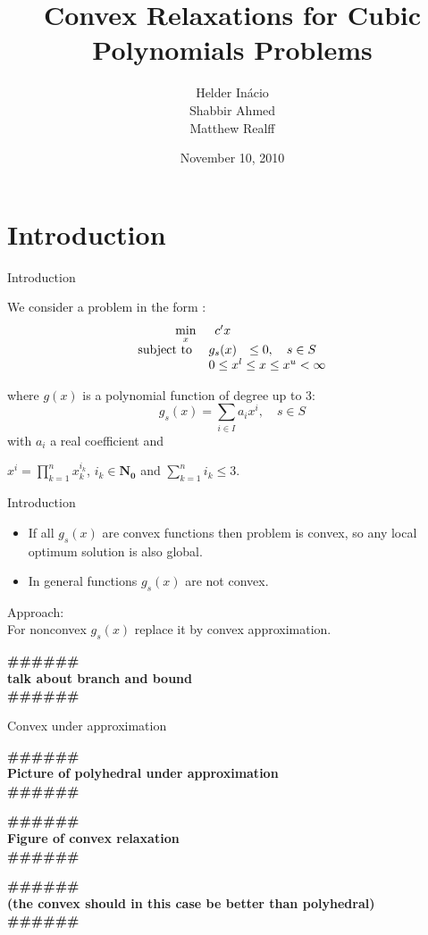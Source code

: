 \documentclass{beamer}
\title{Convex Relaxations for Cubic Polynomials Problems}
\author[In\'acio, Ahmed, Realff]{Helder In\'acio \\ Shabbir Ahmed \\ Matthew Realff}
\date{November 10, 2010}
\institute[GATech]{Georgia Institute of Technology}
\newcommand{\todo}[1]
{\begin{tiny}
  \begin{center} {\color{red}
  \textbf{ {\#\#\#\hfill\#\#\#}\\{#1}\\\#\#\#\hfill\#\#\#}}
\end{center}
\end{tiny}} %
\begin{document}
\begin{frame}
\titlepage
\end{frame}

\section{Introduction}

\begin{frame}{Introduction}

  We consider a problem in the form :
  \begin{displaymath}
    \begin{array}[h]{rcl}
      \min\limits_x & c'x & \\
      \text{subject to } & g_s(x) & \leq 0 , \quad s \in S\\
      & \multicolumn{2}{l}{ 0 \leq x^l \leq x \leq x^u < \infty} \\
    \end{array}
  \end{displaymath}

where $g(x)$ is a polynomial function of degree up to 3:
\begin{displaymath}
  g_s(x) = \sum_{i \in I} a_i x^i, \quad s \in S
\end{displaymath}
with $a_i$ a real coefficient and

$x^i = \prod_{k=1}^{n} x_k^{i_k}$, $i_k \in \mathbf{N_0}$ and $\sum_{k=1}^n i_k \leq 3$.

\end{frame}

\begin{frame}{Introduction}

  \begin{itemize}
    \item
  If all $g_s(x)$ are convex functions then problem is convex,
  so any local optimum solution is also global.
  \item
    In general functions $g_s(x)$ are not convex.
  \end{itemize}

  Approach: \\
  For nonconvex $g_s(x)$ replace it by convex approximation.
  \todo{talk about branch and bound}

\end{frame}

\begin{frame}{Convex under approximation }

  \todo{ Picture of polyhedral under approximation}
  \todo{ Figure of convex relaxation }

  \todo{ (the convex should in this case be better than polyhedral)}

\end{frame}
\end{document}
